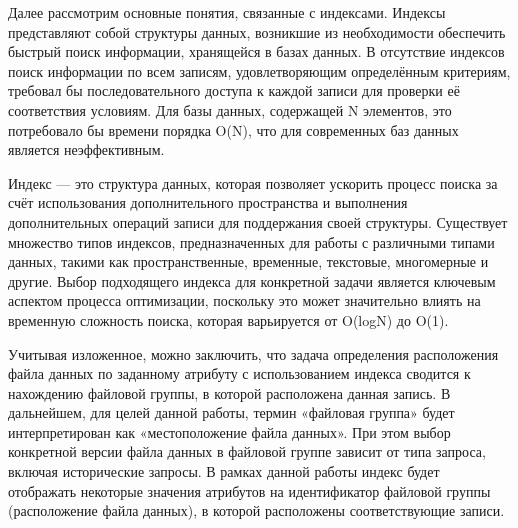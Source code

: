 Далее рассмотрим основные понятия, связанные с индексами. Индексы представляют собой структуры данных, возникшие из необходимости обеспечить быстрый поиск информации, хранящейся в базах данных. В отсутствие индексов поиск информации по всем записям, удовлетворяющим определённым критериям, требовал бы последовательного доступа к каждой записи для проверки её соответствия условиям. Для базы данных, содержащей N элементов, это потребовало бы времени порядка O(N), что для современных баз данных является неэффективным.

Индекс — это структура данных, которая позволяет ускорить процесс поиска за счёт использования дополнительного пространства и выполнения дополнительных операций записи для поддержания своей структуры. Существует множество типов индексов, предназначенных для работы с различными типами данных, такими как пространственные, временные, текстовые, многомерные и другие. Выбор подходящего индекса для конкретной задачи является ключевым аспектом процесса оптимизации, поскольку это может значительно влиять на временную сложность поиска, которая варьируется от O(logN) до O(1).

Учитывая изложенное, можно заключить, что задача определения расположения файла данных по заданному атрибуту с использованием индекса сводится к нахождению файловой группы, в которой расположена данная запись. В дальнейшем, для целей данной работы, термин «файловая группа» будет интерпретирован как «местоположение файла данных». При этом выбор конкретной версии файла данных в файловой группе зависит от типа запроса, включая исторические запросы. В рамках данной работы индекс будет отображать некоторые значения атрибутов на идентификатор файловой группы (расположение файла данных), в которой расположены соответствующие записи.